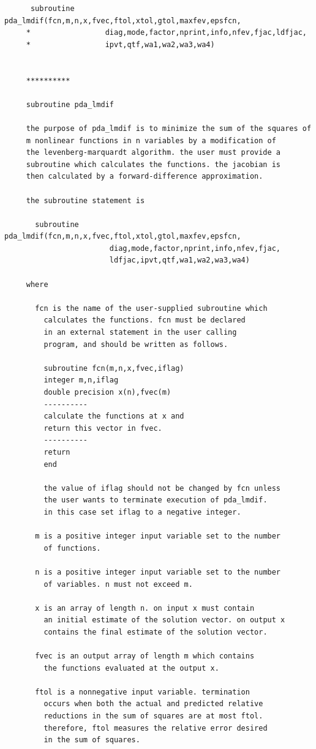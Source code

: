 \documentclass[11pt,twoside]{article}
\begin{document}
\begin{verbatim}
      subroutine pda_lmdif(fcn,m,n,x,fvec,ftol,xtol,gtol,maxfev,epsfcn,
     *                 diag,mode,factor,nprint,info,nfev,fjac,ldfjac,
     *                 ipvt,qtf,wa1,wa2,wa3,wa4)


     **********

     subroutine pda_lmdif

     the purpose of pda_lmdif is to minimize the sum of the squares of
     m nonlinear functions in n variables by a modification of
     the levenberg-marquardt algorithm. the user must provide a
     subroutine which calculates the functions. the jacobian is
     then calculated by a forward-difference approximation.

     the subroutine statement is

       subroutine pda_lmdif(fcn,m,n,x,fvec,ftol,xtol,gtol,maxfev,epsfcn,
                        diag,mode,factor,nprint,info,nfev,fjac,
                        ldfjac,ipvt,qtf,wa1,wa2,wa3,wa4)

     where

       fcn is the name of the user-supplied subroutine which
         calculates the functions. fcn must be declared
         in an external statement in the user calling
         program, and should be written as follows.

         subroutine fcn(m,n,x,fvec,iflag)
         integer m,n,iflag
         double precision x(n),fvec(m)
         ----------
         calculate the functions at x and
         return this vector in fvec.
         ----------
         return
         end

         the value of iflag should not be changed by fcn unless
         the user wants to terminate execution of pda_lmdif.
         in this case set iflag to a negative integer.

       m is a positive integer input variable set to the number
         of functions.

       n is a positive integer input variable set to the number
         of variables. n must not exceed m.

       x is an array of length n. on input x must contain
         an initial estimate of the solution vector. on output x
         contains the final estimate of the solution vector.

       fvec is an output array of length m which contains
         the functions evaluated at the output x.

       ftol is a nonnegative input variable. termination
         occurs when both the actual and predicted relative
         reductions in the sum of squares are at most ftol.
         therefore, ftol measures the relative error desired
         in the sum of squares.


\end{verbatim}
\end{document}

